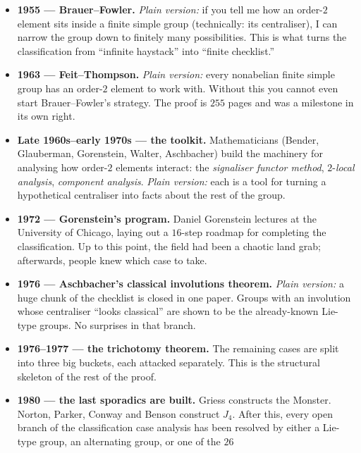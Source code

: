 \documentclass[11pt]{article}
\begin{document}
\begin{itemize}[leftmargin=*, itemsep=4pt]
  \item \textbf{1955 --- Brauer--Fowler.} \emph{Plain version:} if
        you tell me how an order-$2$ element sits inside a finite
        simple group (technically: its centraliser), I can narrow
        the group down to finitely many possibilities. This is what
        turns the classification from ``infinite haystack'' into
        ``finite checklist.''
  \item \textbf{1963 --- Feit--Thompson.} \emph{Plain version:}
        every nonabelian finite simple group has an order-$2$
        element to work with. Without this you cannot even start
        Brauer--Fowler's strategy. The proof is $255$ pages and
        was a milestone in its own right.
  \item \textbf{Late 1960s--early 1970s --- the toolkit.}
        Mathematicians (Bender, Glauberman, Gorenstein, Walter,
        Aschbacher) build the machinery for analysing how
        order-$2$ elements interact: the \emph{signaliser functor
        method}, $2$-\emph{local analysis}, \emph{component
        analysis}. \emph{Plain version:} each is a tool for turning
        a hypothetical centraliser into facts about the rest of the
        group.
  \item \textbf{1972 --- Gorenstein's program.} Daniel Gorenstein
        lectures at the University of Chicago, laying out a $16$-step
        roadmap for completing the classification. Up to this
        point, the field had been a chaotic land grab; afterwards,
        people knew which case to take.
  \item \textbf{1976 --- Aschbacher's classical involutions
        theorem.} \emph{Plain version:} a huge chunk of the
        checklist is closed in one paper. Groups with an involution
        whose centraliser ``looks classical'' are shown to be the
        already-known Lie-type groups. No surprises in that branch.
  \item \textbf{1976--1977 --- the trichotomy theorem.} The
        remaining cases are split into three big buckets, each
        attacked separately. This is the structural skeleton of the
        rest of the proof.
  \item \textbf{1980 --- the last sporadics are built.} Griess
        constructs the Monster. Norton, Parker, Conway and Benson
        construct $J_4$. After this, every open branch of the
        classification case analysis has been resolved by either a
        Lie-type group, an alternating group, or one of the $26$

\end{itemize}
\end{document}
